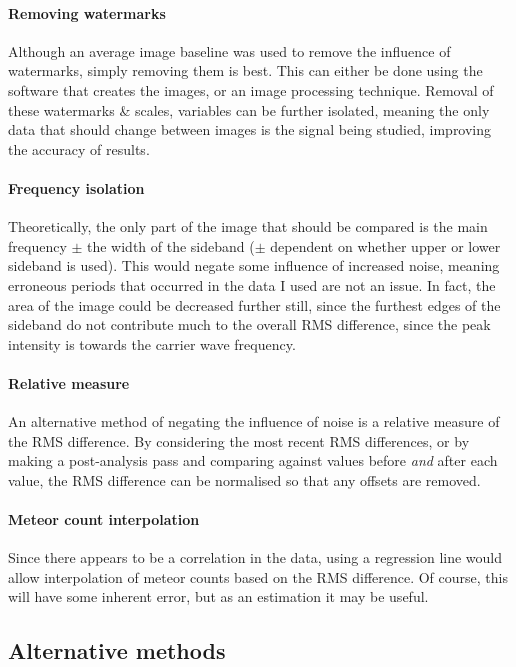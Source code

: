 \paragraph{Removing watermarks\\}
Although an average image baseline was used to remove the influence of watermarks, simply removing them is best. This can either be done using the software that creates the images, or an image processing technique. Removal of these watermarks \& scales, variables can be further isolated, meaning the only data that should change between images is the signal being studied, improving the accuracy of results.
\paragraph{Frequency isolation\\}
Theoretically, the only part of the image that should be compared is the main frequency $\pm$ the width of the sideband ($\pm$ dependent on whether upper or lower sideband is used). This would negate some influence of increased noise, meaning erroneous periods that occurred in the data I used are not an issue. In fact, the area of the image could be decreased further still, since the furthest edges of the sideband do not contribute much to the overall RMS difference, since the peak intensity is towards the carrier wave frequency.
\paragraph{Relative measure\\}
An alternative method of negating the influence of noise is a relative measure of the RMS difference. By considering the most recent RMS differences, or by making a post-analysis pass and comparing against values before {\it and} after each value, the RMS difference can be normalised so that any offsets are removed.
\paragraph{Meteor count interpolation\\}
Since there appears to be a correlation in the data, using a regression line would allow interpolation of meteor counts based on the RMS difference. Of course, this will have some inherent error, but as an estimation it may be useful.
\subsection{Alternative methods}
